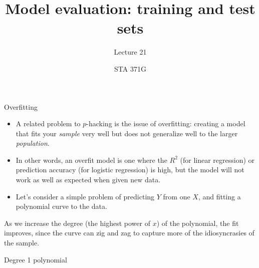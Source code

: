 \documentclass{beamer}\usepackage[]{graphicx}\usepackage[]{color}
\title{Model evaluation: training and test sets}
\subtitle{Lecture 21}
\author{STA 371G}
\newenvironment{knitrout}{}{} %
\begin{document}
  

  

  \frame{\maketitle}



  \begin{darkframes}
    \begin{frame}{Overfitting}
      \begin{itemize}
        \item A related problem to $p$-hacking is the issue of \alert{overfitting}: creating a model that fits your \emph{sample} very well but does not generalize well to the larger \emph{population}.
        \item In other words, an overfit model is one where the $R^2$ (for linear regression) or prediction accuracy (for logistic regression) is high, but the model will not work as well as expected when given new data.
        \item Let's consider a simple problem of predicting $Y$ from one $X$, and fitting a polynomial curve to the data.
      \end{itemize}
    \end{frame}

    \begin{frame}
\begin{knitrout}


\end{knitrout}

      \pause
      \vspace{-1cm}
      As we increase the degree (the highest power of $x$) of the polynomial, the fit improves, since the curve can zig and zag to capture more of the idiosyncrasies of the sample.
    \end{frame}

    \begin{frame}
    \end{frame}

    \begin{frame}{Degree 1 polynomial}
\begin{knitrout}



\end{knitrout}
\end{frame}
\end{darkframes}
\end{document}
